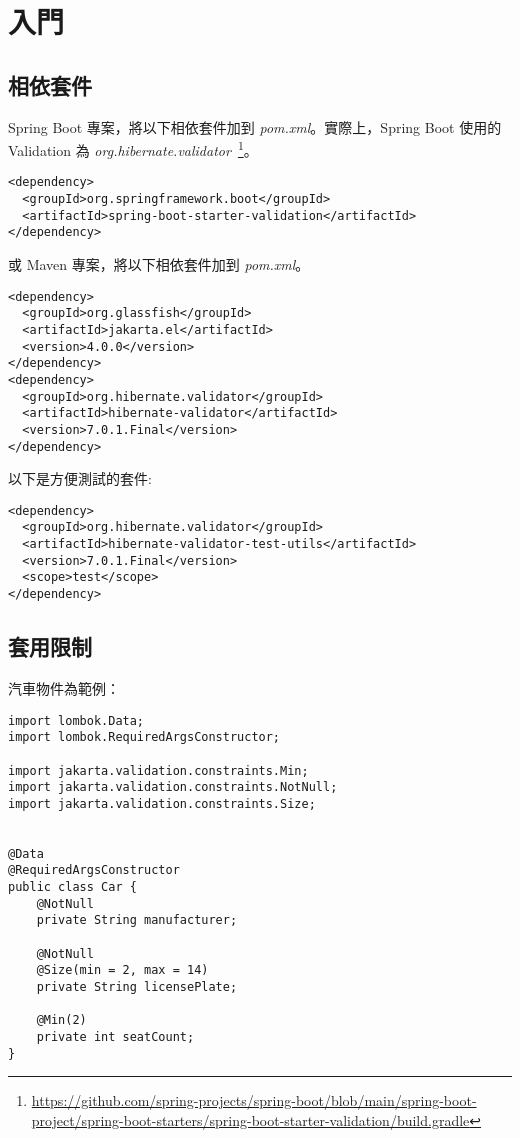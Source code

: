 \chapter{入門}

\section{相依套件}

Spring Boot 專案，將以下相依套件加到 \textit{pom.xml}。實際上，Spring Boot 使用的 Validation 為 \textit{org.{\allowbreak}hibernate.{\allowbreak}validator}~\footnote{\url{https://github.com/spring-projects/spring-boot/blob/main/spring-boot-project/spring-boot-starters/spring-boot-starter-validation/build.gradle}}。

\begin{lstlisting}
<dependency>
  <groupId>org.springframework.boot</groupId>
  <artifactId>spring-boot-starter-validation</artifactId>
</dependency>
\end{lstlisting}

或 Maven 專案，將以下相依套件加到 \textit{pom.xml}。

\begin{lstlisting}
<dependency>
  <groupId>org.glassfish</groupId>
  <artifactId>jakarta.el</artifactId>
  <version>4.0.0</version>
</dependency>
<dependency>
  <groupId>org.hibernate.validator</groupId>
  <artifactId>hibernate-validator</artifactId>
  <version>7.0.1.Final</version>
</dependency>
\end{lstlisting}

以下是方便測試的套件:

\begin{lstlisting}
<dependency>
  <groupId>org.hibernate.validator</groupId>
  <artifactId>hibernate-validator-test-utils</artifactId>
  <version>7.0.1.Final</version>
  <scope>test</scope>
</dependency>
\end{lstlisting}

\section {套用限制}

汽車物件為範例：

\begin{lstlisting}
import lombok.Data;
import lombok.RequiredArgsConstructor;

import jakarta.validation.constraints.Min;
import jakarta.validation.constraints.NotNull;
import jakarta.validation.constraints.Size;


@Data
@RequiredArgsConstructor
public class Car {
    @NotNull
    private String manufacturer;

    @NotNull
    @Size(min = 2, max = 14)
    private String licensePlate;

    @Min(2)
    private int seatCount;
}

\end{lstlisting}

